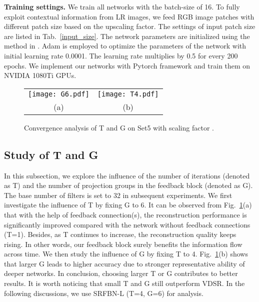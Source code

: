 \documentclass[10pt,twocolumn,letterpaper]{article}
\begin{document}
	\begin{table}[!htbp]
		\centering
		\smallskip
		\caption{The settings of input patch size.\label{input_size}}
	\end{table}
	
	\textbf{Training settings.} We train all networks with the batch-size of 16. To fully exploit contextual information from LR images, we feed RGB image patches with different patch size based on the upscaling factor. The settings of input patch size are listed in Tab.~\ref{input_size}. The network parameters are initialized using the method in \cite{DBLP:conf/iccv/HeZRS15}. Adam\cite{Kingma2014Adam} is employed to optimize the parameters of the network with initial learning rate 0.0001. The learning rate multiplies by 0.5 for every 200 epochs. We implement our networks with Pytorch framework and train them on NVIDIA 1080Ti GPUs.
	
	\begin{figure}[!htbp]
		\begin{center}
			\begin{tabular}{@{}c@{}c@{}}
				\texttt{[image: G6.pdf]} & \texttt{[image: T4.pdf]}\\
				
				\small (a)& \small (b)
			\end{tabular}
			
		\end{center}
		\caption{Convergence analysis of T and G on Set5 with scaling factor .}
		\label{T_and_G}	
		\vspace{-0.45cm}
	\end{figure}
	

	\subsection{Study of T and G}   
	 In this subsection, we explore the influence of the number of iterations (denoted as T) and the number of projection groups in the feedback block (denoted as G). The base number of filters  is set to 32 in subsequent experiments. We first investigate the influence of T by fixing G to 6. It can be observed from Fig.~\ref{T_and_G}(a) that with the help of feedback connection(s), the reconstruction performance is significantly improved compared with the network without feedback connections (T=1). Besides, as T continues to increase, the reconstruction quality keeps rising. In other words, our feedback block surely benefits the information flow across time. We then study the influence of G by fixing T to 4. Fig.~\ref{T_and_G}(b) shows that larger G leads to higher accuracy due to stronger representative ability of deeper networks. In conclusion, choosing larger T or G contributes to better results. It is worth noticing that small T and G still outperform VDSR\cite{Kim_2016_CVPR}. In the following discussions, we use SRFBN-L (T=4, G=6) for analysis. 
	
\end{document}
